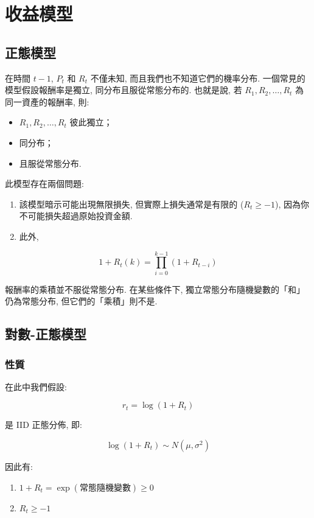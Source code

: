 \documentclass[letterpaper]{article}
\begin{document}
		\section{收益模型}
		\subsection{正態模型}
		在時間 $t-1$, $P_{t}$ 和 $R_{t}$ 不僅未知, 而且我們也不知道它們的機率分布. 
		一個常見的模型假設報酬率是獨立, 同分布且服從常態分布的. 
		也就是說, 若 $R_{1}, R_{2}, \ldots, R_{t}$ 為同一資產的報酬率, 則: 
		
		\begin{itemize}
			\item $R_{1}, R_{2}, \ldots, R_{t}$ 彼此獨立；
			\item 同分布；
			\item 且服從常態分布. 
		\end{itemize}
		
		
		此模型存在兩個問題: 
		
		\begin{enumerate}
			\item 該模型暗示可能出現無限損失, 但實際上損失通常是有限的 ($R_{t} \geq -1$), 因為你不可能損失超過原始投資金額. 
			\item 此外, 
		\end{enumerate}
		
		$$
		1+R_{t} (k) =\prod_{i=0}^{k-1}\left (1+R_{t-i}\right) 
		$$
		
		報酬率的乘積並不服從常態分布. 在某些條件下, 獨立常態分布隨機變數的「和」仍為常態分布, 但它們的「乘積」則不是. 
		
		
		\subsection{對數-正態模型}
		\subsubsection{性質}
		在此中我們假設: 
		
		$$
		r_{t}=\log \left (1+R_{t}\right) 
		$$
		
		是 IID 正態分佈, 即: 
		
		$$
		\log \left (1+R_{t}\right) \sim N\left (\mu, \sigma^{2}\right) 
		$$
		
		因此有: 
		
		\begin{enumerate}
			\item $1 + R_{t} = \exp (\text{常態隨機變數}) \geq 0$
			\item $R_{t} \geq -1$
		\end{enumerate}
		
\end{document}
